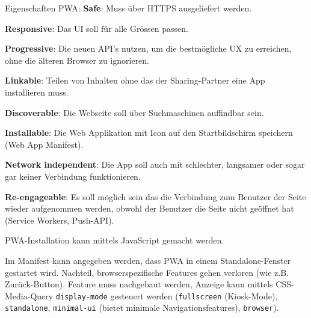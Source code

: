 \documentclass[10pt,landscape]{article}
\begin{document}
\begin{multicols}{2}
        Eigenschaften PWA: \textbf{Safe}: Muss über HTTPS ausgeliefert werden.

        \textbf{Responsive}: Das UI soll für alle Grössen passen.

        \textbf{Progressive}: Die neuen API’s nutzen, um die bestmögliche UX zu erreichen, ohne die älteren Browser zu ignorieren.

        \textbf{Linkable}: Teilen von Inhalten ohne das der Sharing-Partner eine App installieren muss.

        \textbf{Discoverable}: Die Webseite soll über Suchmaschinen auffindbar sein.

        \textbf{Installable}: Die Web Applikation mit Icon auf den Startbildschirm speichern (Web App Manifest).

        \textbf{Network independent}: Die App soll auch mit schlechter, langsamer oder sogar gar keiner Verbindung funktionieren.

        \textbf{Re-engageable}: Es soll möglich sein das die Verbindung zum Benutzer der Seite wieder aufgenommen werden, obwohl der Benutzer die Seite nicht geöffnet hat (Service Workers, Push-API).

        PWA-Installation kann mittels JavaScript gemacht werden.

        Im Manifest kann angegeben werden, dass PWA in einem Standalone-Fenster gestartet wird.
        Nachteil, browserspezifische Features gehen verloren (wie z.B. Zurück-Button).
        Feature muss nachgebaut werden, Anzeige kann mittels CSS-Media-Query \lstinline{display-mode} gesteuert werden (\lstinline{fullscreen} (Kiosk-Mode), \lstinline{standalone}, \lstinline{minimal-ui} (bietet minimale Navigationsfeatures), \lstinline{browser}).
    \end{multicols}
\end{document}
